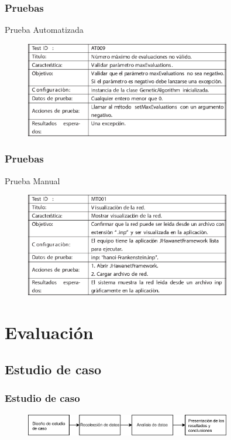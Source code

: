 \documentclass[9pt]{beamer}
\begin{document}
    \begin{frame}
        \frametitle{Pruebas}     
        Prueba Automatizada
        \begin{figure}
            \includegraphics[width=0.8\textwidth]{assets/PruebaAutomatizada.eps}
        \end{figure}
        
    \end{frame}

    \begin{frame}
        \frametitle{Pruebas}     
        Prueba Manual
        \begin{figure}
            \includegraphics[width=0.8\textwidth]{assets/PruebaManual.eps}
        \end{figure}
        
    \end{frame}

    \section{Evaluación}
    \subsection{Estudio de caso}

    \begin{frame}
        \frametitle{Estudio de caso}                       
        
        \begin{figure}
            \includegraphics[width=0.8\textwidth]{assets/Evaluacion/CasoDeEstudio.eps}
        \end{figure}

    \end{frame}
\end{document}
